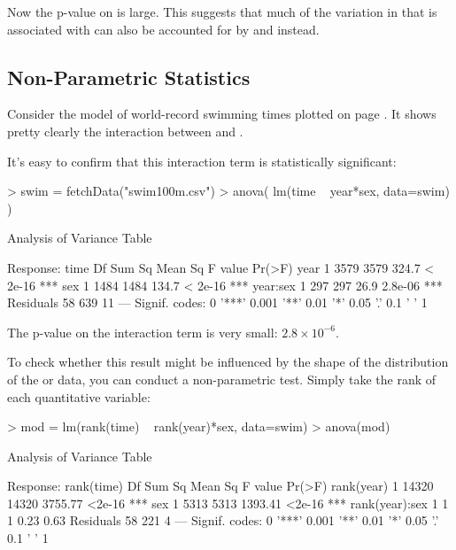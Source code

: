 Now the p-value on  is large.  This suggests that much of
the variation in  that is associated with  can
also be accounted for by  and  instead.


\subsection{Non-Parametric Statistics}

Consider the model of world-record swimming times plotted on page
\pageref{page:interaction-swimming}.  It shows pretty clearly the
interaction between  and .

It's easy to confirm that this interaction term is statistically significant:
\begin{Schunk}
\begin{Sinput}
> swim = fetchData("swim100m.csv")
> anova( lm(time ~ year*sex, data=swim) )
\end{Sinput}
\begin{Soutput}
Analysis of Variance Table

Response: time
          Df Sum Sq Mean Sq F value  Pr(>F)    
year       1   3579    3579   324.7 < 2e-16 ***
sex        1   1484    1484   134.7 < 2e-16 ***
year:sex   1    297     297    26.9 2.8e-06 ***
Residuals 58    639      11                    
---
Signif. codes:  0 '***' 0.001 '**' 0.01 '*' 0.05 '.' 0.1 ' ' 1 
\end{Soutput}
\end{Schunk}

The p-value on the interaction term is very small: $2.8 \times 10^{-6}$.

To check whether this result might be influenced by the shape of the
distribution of the  or  data, you can conduct a
non-parametric test.  Simply take the rank of each quantitative variable:




\begin{Schunk}
\begin{Sinput}
> mod = lm(rank(time) ~ rank(year)*sex, data=swim)
> anova(mod)
\end{Sinput}
\begin{Soutput}
Analysis of Variance Table

Response: rank(time)
               Df Sum Sq Mean Sq F value Pr(>F)    
rank(year)      1  14320   14320 3755.77 <2e-16 ***
sex             1   5313    5313 1393.41 <2e-16 ***
rank(year):sex  1      1       1    0.23   0.63    
Residuals      58    221       4                   
---
Signif. codes:  0 '***' 0.001 '**' 0.01 '*' 0.05 '.' 0.1 ' ' 1 
\end{Soutput}
\end{Schunk}

